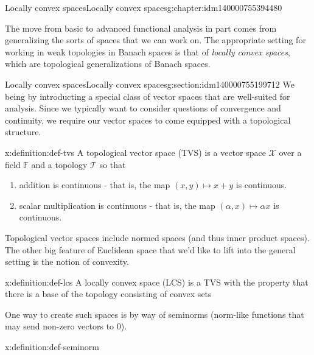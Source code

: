 \documentclass[oneside,10pt,]{book}
\numberwithin{equation}{section}
\numberwithin{equation}{section}
\begin{document}
%
%
\typeout{************************************************}
\typeout{************************************************}
%
\begin{chapterptx}{Locally convex spaces}{}{Locally convex spaces}{}{}{g:chapter:idm140000755394480}
\begin{introduction}{}%
The move from basic to advanced functional analysis in part comes from generalizing the sorts of spaces that we can work on. The appropriate setting for working in weak topologies in Banach spaces is that of \emph{locally convex spaces}, which are topological generalizations of Banach spaces.%
\end{introduction}%
%
%
\typeout{************************************************}
\typeout{************************************************}
%
\begin{sectionptx}{Locally convex spaces}{}{Locally convex spaces}{}{}{g:section:idm140000755199712}
We being by introducting a special class of vector spaces that are well-suited for analysis. Since we typically want to consider questions of convergence and continuity, we require our vector spaces to come equipped with a topological structure.%
\begin{definition}{}{x:definition:def-tvs}%
A topological vector space (TVS) is a vector space \(\mathcal{X}\) over a field \(\mathbb{F}\) and a topology \(\mathcal{T}\) so that%
\begin{enumerate}
\item{}addition is continuous - that is, the map \((x, y)\mapsto x + y\) is continuous.%
\item{}scalar multiplication is continuous - that is, the map \((\alpha, x)\mapsto \alpha x\) is continuous.%
\end{enumerate}
%
\end{definition}
 Topological vector spaces include normed spaces (and thus inner product spaces). The other big feature of Euclidean space that we'd like to lift into the general setting is the notion of convexity. \begin{definition}{}{x:definition:def-lcs}%
A locally convex space (LCS) is a TVS with the property that there is a base of the topology consisting of convex sets%
\end{definition}
 One way to create such spaces is by way of seminorms (norm-like functions that may send non-zero vectors to 0). \begin{definition}{}{x:definition:def-seminorm}%

\end{definition}
\end{sectionptx}
\end{chapterptx}
\end{document}
